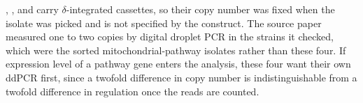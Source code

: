 , ,  and  carry
$\delta$-integrated cassettes, so their copy number was fixed when the isolate
was picked and is not specified by the construct. The source paper measured one
to two copies by digital droplet PCR in the strains it checked, which were the
sorted mitochondrial-pathway isolates rather than these four. If expression level
of a pathway gene enters the analysis, these four want their own ddPCR first,
since a twofold difference in copy number is indistinguishable from a twofold
difference in regulation once the reads are counted.
